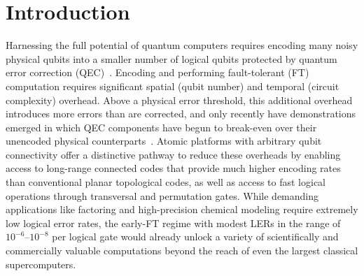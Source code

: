 \documentclass[aps,prx,reprint,showpacs,twocolumn,superscriptaddress,eqsecnum]{revtex4-2}
\begin{document}

\maketitle


\section{Introduction}

Harnessing the full potential of quantum computers requires encoding many noisy physical qubits into a smaller number of logical qubits protected by quantum error correction (QEC)~\cite{shor1995}.
Encoding and performing fault-tolerant (FT) computation requires significant spatial (qubit number) and temporal (circuit complexity) overhead.
Above a physical error threshold, this additional overhead introduces more errors than are corrected, and only recently have demonstrations emerged in which QEC components have begun to break-even over their unencoded physical counterparts~\cite{anderson2021, Sivak_2023, Gupta2024, Hong_2024, bedalov2024, paetznick2024, google2024, Lacroix_2025, reichardt2025, dasu2025, dasu2026, Sivak2026}. 
Atomic platforms with arbitrary qubit connectivity offer a distinctive pathway to reduce these overheads by enabling access to long-range connected codes that provide much higher encoding rates than conventional planar topological codes, as well as access to fast logical operations through transversal and permutation gates.
While demanding applications like factoring and high-precision chemical modeling require extremely low logical error rates, the early-FT regime with modest LERs in the range of $10^{-6}$--$10^{-8}$ per logical gate would already unlock a variety of scientifically and commercially valuable computations beyond the reach of even the largest classical supercomputers.
\end{document}
